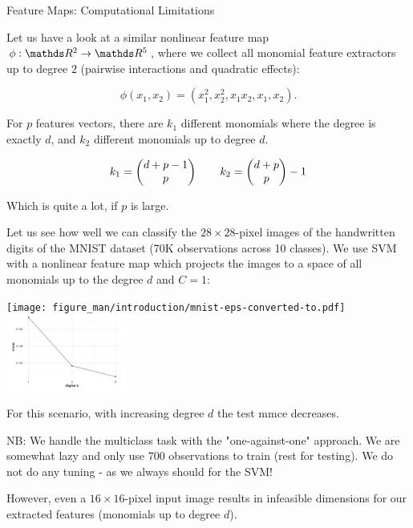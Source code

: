 \begin{vbframe}{Feature Maps: Computational Limitations}

Let us have a look at a similar nonlinear feature map $\phi: \R^2 \to \R^5$, where we collect all monomial feature extractors up to degree $2$ (pairwise interactions and quadratic effects):

$$
\phi(x_1, x_2) = (x_1^2, x_2^2, x_1  x_2, x_1, x_2).
$$

For $p$ features vectors, there are $k_1$ different monomials where the degree is exactly $d$, and $k_2$ different monomials up to degree $d$.


$$
k_1 = \begin{pmatrix} d + p - 1 \\ p \end{pmatrix} \qquad k_2 = \begin{pmatrix} d + p \\ p \end{pmatrix}-1
$$

Which is quite a lot, if $p$ is large.

\framebreak 
\begin{footnotesize}
Let us see how well we can classify the $28 \times 28$-pixel images of the handwritten digits of the MNIST dataset (70K observations across 10 classes). 
We use SVM with a nonlinear feature map which projects the images to a space of all monomials up to the degree $d$ and $C=1$:


\begin{center}
\texttt{[image: figure\_man/introduction/mnist-eps-converted-to.pdf]} ~~~ \includegraphics[width=4cm]{figure_man/computational_limits1.png}
\end{center}




\vspace{.3cm}
For this scenario, with increasing degree $d$ the test mmce decreases.

\vfill

NB: We handle the multiclass task with the "one-against-one" approach. 
We are somewhat lazy and only use 700 observations to train (rest for testing).
We do not do any tuning - as we always should for the SVM!

\end{footnotesize}

\framebreak

However, even a $16 \times 16$-pixel input image results in infeasible dimensions for our extracted features (monomials up to degree $d$).


\end{vbframe}
